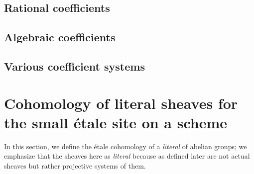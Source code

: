 \subsection{Rational coefficients}




\subsection{Algebraic coefficients}




\subsection{Various coefficient systems}






\section{Cohomology of literal sheaves for the small \'etale site on a scheme}

In this section, we define the \'etale cohomology of a \emph{literal}  of abelian groups; we emphasize that the sheaves here as \emph{literal} because  as defined later are not actual sheaves but rather projective systems of them.

